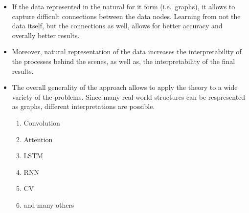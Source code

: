 \begin{itemize}
    \item If the data represented in the natural for it form (i.e.~graphs), it allows to
          capture difficult connections between the data nodes. Learning from not the
          data itself, but the connections as well, allows for better accuracy and
          overally better results.
    \item Moreover, natural representation of the data increases the interpretability of
          the processes behind the scenes, as well as, the interpretability of the final
          results.
    \item The overall generality of the approach allows to apply the theory to a wide
          variety of the problems. Since many real-world structures can be respresented
          as graphs, different interpretations are possible.
          \begin{enumerate}
              \item Convolution
              \item Attention
              \item LSTM
              \item RNN
              \item CV
              \item and many others
          \end{enumerate}
\end{itemize}
